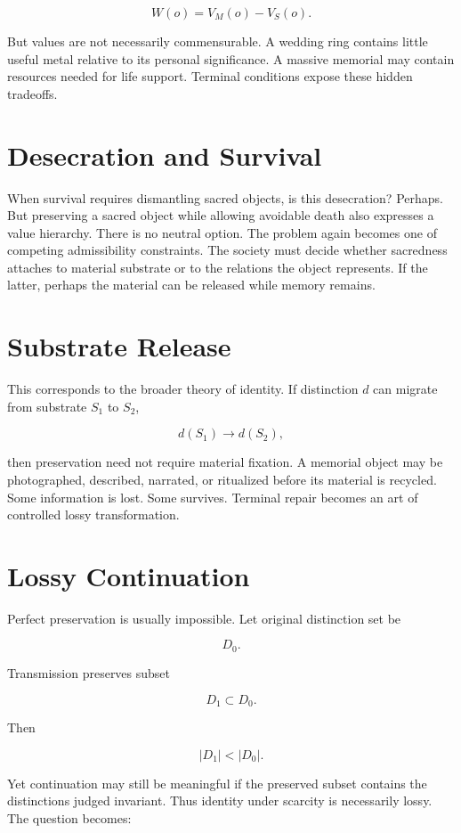 \documentclass[11pt,oneside]{book}
\theoremstyle{definition}
\theoremstyle{remark}
\begin{document}
\[
W(o) = V_M(o)-V_S(o).
\]

But values are not necessarily commensurable. A wedding ring contains little useful metal relative
to its personal significance. A massive memorial may contain resources needed for life support.
Terminal conditions expose these hidden tradeoffs.

\section{Desecration and Survival}

When survival requires dismantling sacred objects, is this desecration? Perhaps. But preserving a
sacred object while allowing avoidable death also expresses a value hierarchy. There is no neutral
option. The problem again becomes one of competing admissibility constraints. The society must
decide whether sacredness attaches to material substrate or to the relations the object represents.
If the latter, perhaps the material can be released while memory remains.

\section{Substrate Release}

This corresponds to the broader theory of identity. If distinction \(d\) can migrate from substrate
\(S_1\) to \(S_2\),

\[
d(S_1) \rightarrow d(S_2),
\]

then preservation need not require material fixation. A memorial object may be photographed,
described, narrated, or ritualized before its material is recycled. Some information is lost. Some
survives. Terminal repair becomes an art of controlled lossy transformation.

\section{Lossy Continuation}

Perfect preservation is usually impossible. Let original distinction set be

\[
D_0.
\]

Transmission preserves subset

\[
D_1\subset D_0.
\]

Then

\[
|D_1|<|D_0|.
\]

Yet continuation may still be meaningful if the preserved subset contains the distinctions judged
invariant. Thus identity under scarcity is necessarily lossy. The question becomes:
\end{document}
